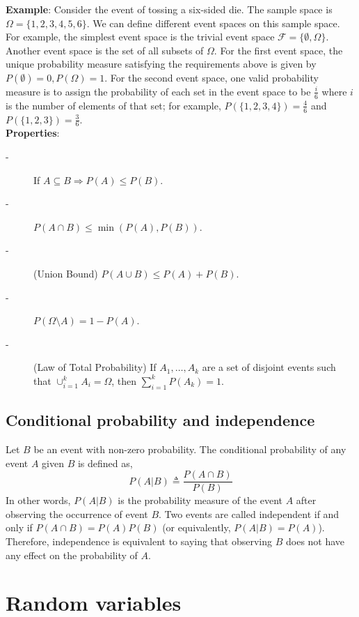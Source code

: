 \documentclass{article}
\begin{document}
\textbf{Example}: Consider the event of tossing a six-sided die. The
sample space is $\Omega= \{1,2,3,4,5,6\}$. We can define different
  event spaces on this sample space. For example, the simplest event
  space is the trivial event space $\mathcal{F}=\{\emptyset,
  \Omega\}$. Another event space is the set of all subsets of
  $\Omega$. For the first event space, the unique probability measure 
  satisfying the requirements above is
  given by $P(\emptyset)=0, P(\Omega)=1$. For the second event space,
  one valid probability measure is to assign the probability of each set in the event space to be $\frac{i}{6}$
  where $i$ is the number of elements of that set; for example,
  $P(\{1,2,3,4\})= \frac{4}{6}$ and $P(\{1,2,3\})= \frac{3}{6}$. \\

\textbf{Properties}:
\begin{description}
\item[-] {If $ {A \subseteq B \Longrightarrow P(A) \leq P(B)}$.}
\item[-] ${P(A \cap B) \leq \min(P(A), P(B))}$.
\item[-] (Union Bound) ${P(A \cup B) \leq P(A)+P(B)}$.
\item[-] ${P(\Omega \setminus A)=1-P(A)}$.
\item[-] {(Law of Total Probability) If $A_1,\ldots,A_k$ are a set of disjoint events such that $\cup_{i=1}^k A_i = \Omega$, then $\sum_{i=1}^k P(A_k) = 1$.}
\end{description}

\subsection{Conditional probability and independence}

Let $B$ be an event with non-zero probability. The conditional probability of any event $A$ given $B$ is defined as,
\begin{equation*}
P(A | B)\triangleq \frac{P(A \cap B)}{P(B)}
\end{equation*}
In other words, $P(A| B)$ is the probability measure of the event $A$
after observing the occurrence of event $B$. Two events are called
independent if and only if $P(A \cap B)= P(A)P(B)$ (or equivalently, $P(A|B)=P(A)$).  Therefore,
independence is equivalent to saying that observing $B$ does not have
any effect on the probability of $A$.

\section{Random variables}
\end{document}
